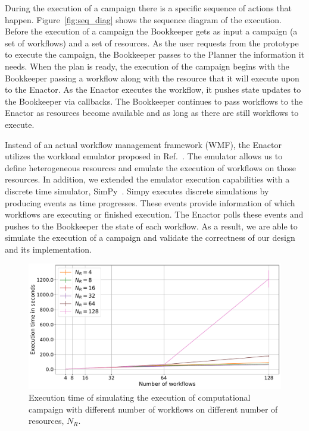 During the execution of a campaign there is a specific sequence of actions 
that happen. Figure~\ref{fig:seq_diag} shows the sequence diagram of the 
execution. Before the execution of a campaign the Bookkeeper gets as input a 
campaign (a set of workflows) and a set of resources. As the user requests 
from the prototype to execute the campaign, the Bookkeeper passes to the 
Planner the information it needs. When the plan is ready, the execution of the 
campaign begins with the Bookkeeper passing a workflow along with the resource 
that it will execute upon to the Enactor. As the Enactor executes the 
workflow, it pushes state updates to the Bookkeeper via callbacks. The 
Bookkeeper continues to pass workflows to the Enactor as resources become 
available and as long as there are still workflows to execute.

Instead of an actual workflow management framework (WMF), the Enactor utilizes 
the workload emulator proposed in Ref.~\cite{balasubramanian2019programming}.
The emulator allows us to define heterogeneous resources and emulate the 
execution of workflows on those resources. In addition, we extended the 
emulator execution capabilities with a discrete time simulator, 
SimPy~\cite{simpy}. Simpy executes discrete simulations by producing events as 
time progresses. These events provide information of which workflows are 
executing or finished execution. The Enactor polls these events and pushes to 
the Bookkeeper the state of each workflow. As a result, we are able to 
simulate the execution of a campaign and validate the correctness of our 
design and its implementation.

\begin{figure}[t]
    \centering
    \includegraphics[width=.95\textwidth]{figures/manager/SimTimeWork.pdf}
    \caption{Execution time of simulating the execution of computational campaign with different number of workflows on different number of resources, $N_R$.}
    \label{fig:cm_char}
\end{figure}

